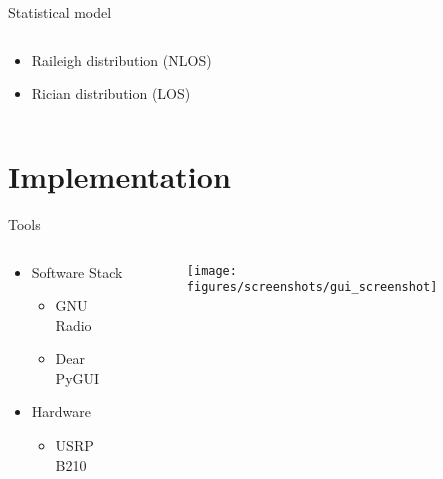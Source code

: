 \documentclass[xetex, onlymath, handout]{beamer}
\begin{document}
\begin{frame}[fragile]{Statistical model}
  \begin{columns}
    \begin{column}{.5\linewidth}
      \begin{itemize}
        \item Raileigh distribution (NLOS)
        \item Rician distribution (LOS) 
     \end{itemize}
    \end{column}
    \begin{column}{.5\linewidth}
  	  \begin{figure}
  		\centering
  		\resizebox{!}{4cm}{%
  			
  		}
  	 \end{figure}
    \end{column}
  \end{columns}
\end{frame}





\section{Implementation}


\begin{frame}{Tools}
  \begin{columns}
	\begin{column}{.5\linewidth}
		\begin{itemize}
			\item Software Stack
				\begin{itemize}
					\item GNU Radio
					\item Dear PyGUI
				\end{itemize}
			\item Hardware
			\begin{itemize}
				\item USRP B210
			\end{itemize}
		\end{itemize}
	\end{column}
	\begin{column}{.5\linewidth}
		\begin{figure}
		\centering
		\texttt{[image: figures/screenshots/gui\_screenshot]}
		\end{figure}
	\end{column}
\end{columns}
\end{frame}
\end{document}
